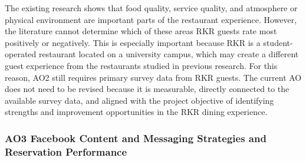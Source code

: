 \documentclass[
  12pt,
  letterpaper,
  DIV=11,
  numbers=noendperiod]{scrartcl}
\begin{document}
The existing research shows that food quality, service quality, and
atmosphere or physical environment are important parts of the restaurant
experience. However, the literature cannot determine which of these
areas RKR guests rate most positively or negatively. This is especially
important because RKR is a student-operated restaurant located on a
university campus, which may create a different guest experience from
the restaurants studied in previous research. For this reason, AO2 still
requires primary survey data from RKR guests. The current AO does not
need to be revised because it is measurable, directly connected to the
available survey data, and aligned with the project objective of
identifying strengths and improvement opportunities in the RKR dining
experience.

\subsubsection{AO3 Facebook Content and Messaging Strategies and
Reservation
Performance}\label{ao3-facebook-content-and-messaging-strategies-and-reservation-performance}
\end{document}
